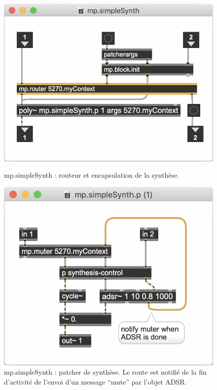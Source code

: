 \begin{figure}[!htbp]
	\captionsetup{format=plain}%
	\centering
	\begin{minipage}[t]{0.510\textwidth}
		\includegraphics[width=\linewidth]{gfx/04_algorithms/MP-reallySimpleSynth.png}
		\caption[mp.simpleSynth : encapsulation de la synthèse]{mp.simpleSynth : routeur et encapsulation de la synthèse.}
		\label{fig:algorithms:MP-simpleSynth}
	\end{minipage}
	\hspace{.02\linewidth}
	\begin{minipage}[t]{0.450\textwidth}
	  	\includegraphics[width=\linewidth]{gfx/04_algorithms/MP-reallySimpleSynth-inside.png}
		\caption[mp.simpleSynth : patcher de synthèse]{mp.simpleSynth : patcher de synthèse. Le route est notifié de la fin d'activité de l'envoi d'un message ``mute'' par l'objet ADSR.}
		\label{fig:algorithms:MP-simpleSynth-inside}
	\end{minipage}
\end{figure}


